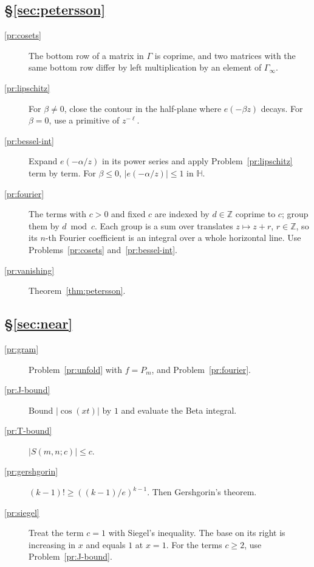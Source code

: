 \documentclass[reqno]{amsart}
\theoremstyle{definition}
\theoremstyle{plain}
\newcommand{\Z}{\mathbb{Z}}
\newcommand{\HH}{\mathbb{H}}
\begin{document}
\subsection*{\S\ref{sec:petersson}}
\begin{description}
\item[\ref{pr:cosets}] The bottom row of a matrix in \(\Gamma\) is coprime, and two matrices with the same bottom row differ by left multiplication by an element of \(\Gamma_\infty\).
\item[\ref{pr:lipschitz}] For \(\beta\ne0\), close the contour in the half-plane where \(e(-\beta z)\) decays.  For \(\beta=0\), use a primitive of \(z^{-\ell}\).
\item[\ref{pr:bessel-int}] Expand \(e(-\alpha/z)\) in its power series and apply Problem~\ref{pr:lipschitz} term by term.  For \(\beta \le 0\), \(\lvert e(-\alpha/z)\rvert \le 1\) in \(\HH\).
\item[\ref{pr:fourier}] The terms with \(c > 0\) and fixed \(c\) are indexed by \(d \in \Z\) coprime to \(c\); group them by \(d \bmod c\).  Each group is a sum over translates \(z \mapsto z + r\), \(r \in \Z\), so its \(n\)-th Fourier coefficient is an integral over a whole horizontal line.  Use Problems~\ref{pr:cosets} and~\ref{pr:bessel-int}.
\item[\ref{pr:vanishing}] Theorem~\ref{thm:petersson}.
\end{description}

\subsection*{\S\ref{sec:near}}
\begin{description}
\item[\ref{pr:gram}] Problem~\ref{pr:unfold} with \(f = P_m\), and Problem~\ref{pr:fourier}.
\item[\ref{pr:J-bound}] Bound \(\lvert\cos(xt)\rvert\) by \(1\) and evaluate the Beta integral.
\item[\ref{pr:T-bound}] \(\lvert S(m,n;c)\rvert \le c\).
\item[\ref{pr:gershgorin}] \((k-1)! \ge ((k-1)/e)^{k-1}\).  Then Gershgorin's theorem.
\item[\ref{pr:siegel}] Treat the term \(c = 1\) with Siegel's inequality.  The base on its right is increasing in \(x\) and equals \(1\) at \(x = 1\).  For the terms \(c \ge 2\), use Problem~\ref{pr:J-bound}.
\end{description}
\end{document}
